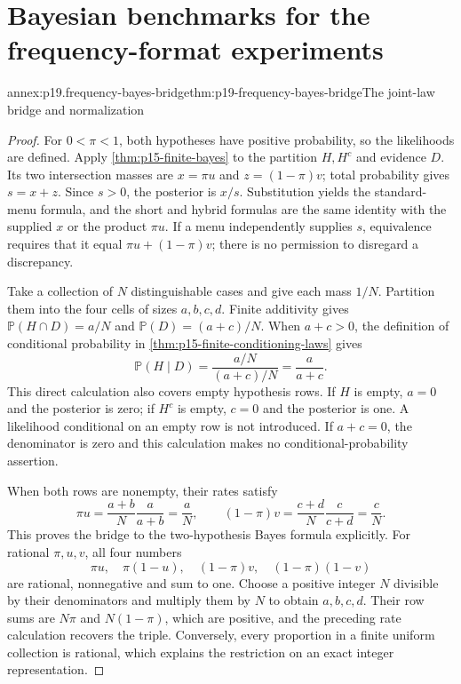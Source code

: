 \section{Bayesian benchmarks for the frequency-format experiments}
\label{sec:annex-p19-natural-frequencies}

\begin{annexitem}{annex:p19.frequency-bayes-bridge}{thm:p19-frequency-bayes-bridge}{The joint-law bridge and normalization}
\begin{proof}
For \(0<\pi<1\), both hypotheses have positive probability, so the
likelihoods are defined. Apply \cref{thm:p15-finite-bayes} to the partition
\(H,H^c\) and evidence \(D\). Its two intersection masses are
\(x=\pi u\) and \(z=(1-\pi)v\); total probability gives \(s=x+z\).
Since \(s>0\), the posterior is \(x/s\). Substitution yields the
standard-menu formula, and the short and hybrid formulas are the same
identity with the supplied \(x\) or the product \(\pi u\).
If a menu independently supplies \(s\), equivalence requires that it equal
\(\pi u+(1-\pi)v\); there is no permission to disregard a discrepancy.

Take a collection of \(N\) distinguishable cases and give each mass
\(1/N\). Partition them into the four cells of sizes \(a,b,c,d\).
Finite additivity gives \(\mathbb P(H\cap D)=a/N\) and
\(\mathbb P(D)=(a+c)/N\). When \(a+c>0\), the definition of
conditional probability in \cref{thm:p15-finite-conditioning-laws} gives
\[
 \mathbb P(H\mid D)=\frac{a/N}{(a+c)/N}=\frac{a}{a+c}.
\]
This direct calculation also covers empty hypothesis rows. If \(H\)
is empty, \(a=0\) and the posterior is zero; if \(H^c\) is empty,
\(c=0\) and the posterior is one. A likelihood conditional on an empty
row is not introduced. If \(a+c=0\), the denominator is zero and this
calculation makes no conditional-probability assertion.

When both rows are nonempty, their rates satisfy
\[
 \pi u=\frac{a+b}{N}\frac{a}{a+b}=\frac aN,\qquad
 (1-\pi)v=\frac{c+d}{N}\frac{c}{c+d}=\frac cN.
\]
This proves the bridge to the two-hypothesis Bayes formula explicitly.
For rational \(\pi,u,v\), all four numbers
\[
 \pi u,\quad\pi(1-u),\quad(1-\pi)v,\quad(1-\pi)(1-v)
\]
are rational, nonnegative and sum to one. Choose a positive integer \(N\)
divisible by their denominators and multiply them by \(N\) to obtain
\(a,b,c,d\). Their row sums are \(N\pi\) and \(N(1-\pi)\), which
are positive, and the preceding rate calculation recovers the triple.
Conversely, every proportion in a finite uniform collection is rational,
which explains the restriction on an exact integer representation.


\end{proof}
\end{annexitem}
